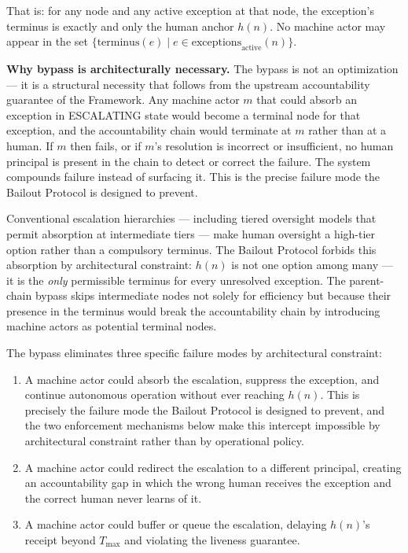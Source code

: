 That is: for any node and any active exception at that node, the exception's terminus is exactly and only the human anchor $h(n)$. No machine actor may appear in the set $\{ \text{terminus}(e) \mid e \in \text{exceptions}_{\text{active}}(n) \}$.

\bigskip
\noindent\textbf{Why bypass is architecturally necessary.} The bypass is not an optimization --- it is a structural necessity that follows from the upstream accountability guarantee of the \bxthree{} Framework. Any machine actor $m$ that could absorb an exception in ESCALATING state would become a terminal node for that exception, and the accountability chain would terminate at $m$ rather than at a human. If $m$ then fails, or if $m$'s resolution is incorrect or insufficient, no human principal is present in the chain to detect or correct the failure. The system compounds failure instead of surfacing it. This is the precise failure mode the Bailout Protocol is designed to prevent.

Conventional escalation hierarchies --- including tiered oversight models that permit absorption at intermediate tiers --- make human oversight a high-tier option rather than a compulsory terminus. The Bailout Protocol forbids this absorption by architectural constraint: $h(n)$ is not one option among many --- it is the \emph{only} permissible terminus for every unresolved exception. The parent-chain bypass skips intermediate nodes not solely for efficiency but because their presence in the terminus would break the accountability chain by introducing machine actors as potential terminal nodes.

The bypass eliminates three specific failure modes by architectural constraint:

\begin{enumerate}
\item[\textbf{Intercept.}] A machine actor could absorb the escalation, suppress the exception, and continue autonomous operation without ever reaching $h(n)$. This is precisely the failure mode the Bailout Protocol is designed to prevent, and the two enforcement mechanisms below make this intercept impossible by architectural constraint rather than by operational policy.

\item[\textbf{Redirect.}] A machine actor could redirect the escalation to a different principal, creating an accountability gap in which the wrong human receives the exception and the correct human never learns of it.

\item[\textbf{Delay.}] A machine actor could buffer or queue the escalation, delaying $h(n)$'s receipt beyond $T_{\max}$ and violating the liveness guarantee.
\end{enumerate}

